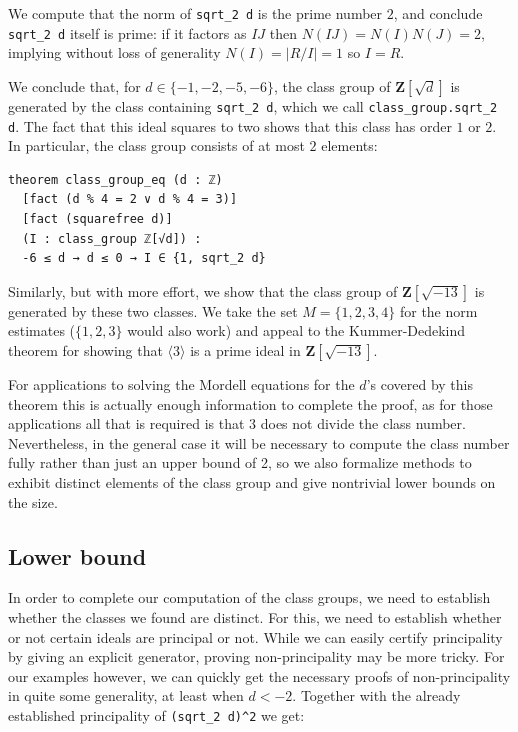 \documentclass[sigplan,10pt,nonacm,
screen]{acmart} \settopmatter{printfolios=true,printccs=false,printacmref=false}
\newcommand{\ZZ}{\mathbf{Z}}
\begin{document}
We compute that the norm of \lstinline{sqrt_2 d} is the prime number $2$,
and conclude \lstinline{sqrt_2 d} itself is prime:
if it factors as $IJ$ then $N(IJ) = N(I) N(J) = 2$,
implying without loss of generality $N(I) = |R/I| = 1$ so $I = R$.

We conclude that, for $d\in \{-1,-2,-5,-6\}$, the class group of $\ZZ[\sqrt{d}]$ is generated by the class containing \lstinline{sqrt_2 d}, which we call \lstinline{class_group.sqrt_2 d}.
The fact that this ideal squares to two shows that this class has order $1$ or $2$. In particular, the class group consists of at most $2$ elements:
\begin{lstlisting}
theorem class_group_eq (d : ℤ)
  [fact (d % 4 = 2 ∨ d % 4 = 3)]
  [fact (squarefree d)]
  (I : class_group ℤ[√d]) :
  -6 ≤ d → d ≤ 0 → I ∈ {1, sqrt_2 d}
\end{lstlisting}

Similarly, but with more effort, we show that the class group of $\ZZ[\sqrt{-13}]$ is generated by these two classes. We take the set $M=\{1,2,3,4\}$ for the norm estimates ($\{1,2,3\}$ would also work) and appeal to the Kummer-Dedekind theorem for showing that $\langle 3 \rangle$ is a prime ideal in $\ZZ[\sqrt{-13}]$.

For applications to solving the Mordell equations for the $d$'s covered by this theorem this is actually enough information to complete the proof, as for those applications all that is required is that $3$ does not divide the class number.
Nevertheless, in the general case it will be necessary to compute the class number fully rather than just an upper bound of 2,
so we also formalize methods to exhibit distinct elements of the class group and give nontrivial lower bounds on the size.

\subsection{Lower bound}

In order to complete our computation of the class groups,
we need to establish whether the classes we found are distinct.
For this, we need to establish whether or not certain ideals are principal or not.
While we can easily certify principality by giving an explicit generator, proving non-principality may be more tricky.
For our examples however, we can quickly get the necessary proofs of non-principality in quite some generality, at least when $d < -2$.
Together with the already established principality of \lstinline{(sqrt_2 d)^2} we get:
\end{document}

